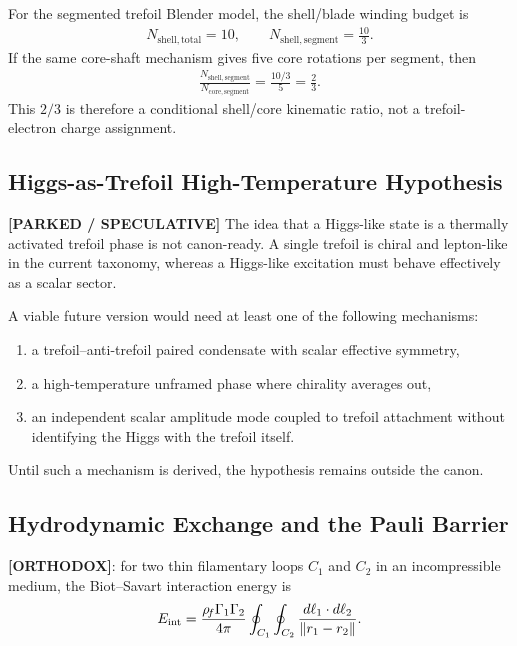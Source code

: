 For the segmented trefoil Blender model, the shell/blade winding budget is
\begin{align}
    N_{\mathrm{shell,total}}=10,
    \qquad
    N_{\mathrm{shell,segment}}=\frac{10}{3}.
\end{align}
If the same core-shaft mechanism gives five core rotations per segment, then
\begin{align}
    \frac{N_{\mathrm{shell,segment}}}{N_{\mathrm{core,segment}}}
    =
    \frac{10/3}{5}
    =
    \frac{2}{3}.
\end{align}
This $2/3$ is therefore a conditional shell/core kinematic ratio, not a trefoil-electron charge assignment.

\subsection{Higgs-as-Trefoil High-Temperature Hypothesis}
\label{subsec:rt_higgs_trefoil_parked}

\textbf{[PARKED / SPECULATIVE]} The idea that a Higgs-like state is a thermally activated trefoil phase is not canon-ready. A single trefoil is chiral and lepton-like in the current taxonomy, whereas a Higgs-like excitation must behave effectively as a scalar sector.

A viable future version would need at least one of the following mechanisms:
\begin{enumerate}
    \item a trefoil--anti-trefoil paired condensate with scalar effective symmetry,
    \item a high-temperature unframed phase where chirality averages out,
    \item an independent scalar amplitude mode coupled to trefoil attachment without identifying the Higgs with the trefoil itself.
\end{enumerate}
Until such a mechanism is derived, the hypothesis remains outside the canon.



\subsection{Hydrodynamic Exchange and the Pauli Barrier}
\textbf{[ORTHODOX]}: for two thin filamentary loops $C_1$ and $C_2$ in an incompressible medium, the Biot--Savart interaction energy is
\begin{align}
    E_{\mathrm{int}}
    =
    \frac{\rho_{\!f}\Gamma_1\Gamma_2}{4\pi}
    \oint_{C_1}\oint_{C_2}
    \frac{d\ell_1\cdot d\ell_2}{\norm{r_1-r_2}}.
\end{align}

